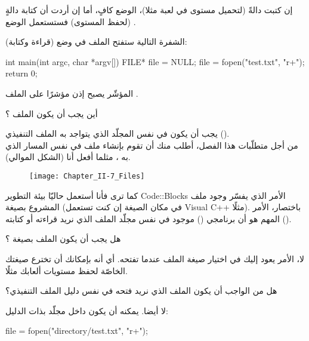 إن كتبت دالةً
(لتحميل مستوى في لعبة مثلا)، الوضع
كافٍ، أما إن أردت أن كتابة دالةٍ
(لحفظ المستوى) فستستعمل الوضع
.

الشفرة التالية ستفتح الملف
في وضع
(قراءة وكتابة):

\begin{Csource}
int main(int argc, char *argv[])
{
	FILE* file = NULL;
	file = fopen("test.txt", "r+");
	return 0;
}
\end{Csource}

المؤشّر
يصبح إذن مؤشرًا على الملف
.

\begin{question}
  أين يجب أن يكون الملف
؟
\end{question}

يجب أن يكون في نفس المجلّد الذي يتواجد به الملف التنفيذي
().\\
من أجل متطلّبات هذا الفصل، أطلب منك أن تقوم بإنشاء ملف
في نفس المسار الذي به
،
مثلما أفعل أنا (الشكل الموالي).

\begin{figure}[H]
	\centering
	\texttt{[image: Chapter\_II-7\_Files]}
\end{figure}

كما ترى فأنا أستعمل  حاليّا بيئة التطوير
\textenglish{Code::Blocks}
الأمر الذي يفسّر وجود ملف المشروع بصيغة
(في مكان الصيغة
إن كنت تستعمل
\textenglish{Visual C++}
مثلًا). باختصار، الأمر المهم هو أن برنامجي
()
موجود في نفس مجلّد الملف الذي نريد قراءته أو كتابته
().

\begin{question}
  هل يجب أن يكون الملف بصيغة
؟
\end{question}

لا، الأمر يعود إليك في اختيار صيغة الملف عندما تفتحه. أي أنه بإمكانك أن تخترع صيغتك الخاصّة
لحفظ مستويات ألعابك مثلًا.

\begin{question}
  هل من الواجب أن يكون الملف الذي نريد فتحه في نفس دليل الملف التنفيذي؟
\end{question}

لا أيضا. يمكنه أن يكون داخل مجلّد بذات الدليل:

\begin{Csource}
file = fopen("directory/test.txt", "r+");
\end{Csource}

